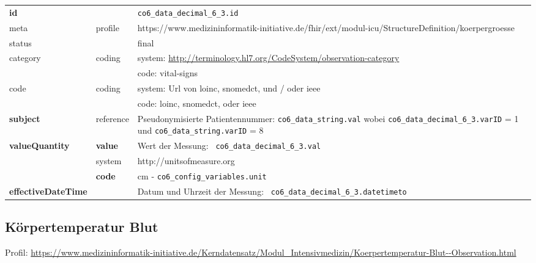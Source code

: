 \begin{longtable}{|l|l|p{7.5cm}|}
        \hline
        \rowcolor{lightgray} \multicolumn{3}{|l|}{Data Mapping (inhaltlich)} \\ \hline
        \textbf{id} &  & \texttt{co6\_data\_decimal\_6\_3.id} \\ \hline
	meta & profile & https://www.medizininformatik-initiative.de/fhir/ext/modul-icu/StructureDefinition/koerpergroesse \\ \hline 
	status &  & final   \\ \hline 
	category & coding & system: \url{http://terminology.hl7.org/CodeSystem/observation-category} \\
\cline{3-3}
	& & code: vital-signs \\ \hline
	code & coding & system: Url von \ac{loinc}, \ac{snomedct}, und / oder \ac{ieee} \\ 
	\cline{3-3} 
	 &  & code: \ac{loinc}, \ac{snomedct}, oder \ac{ieee} \\ \hline
	\textbf{subject} & reference & Pseudonymisierte Patientennummer: \texttt{co6\_data\_string.val} wobei \texttt{co6\_data\_decimal\_6\_3.varID} = 1 und \texttt{co6\_data\_string.varID} = 8 \\ \hline
	 \textbf{valueQuantity}  & \textbf{value} & Wert der Messung: \texttt{
co6\_data\_decimal\_6\_3.val} \\
        \cline{2-3}
         & system & http://unitsofmeasure.org \\
         \cline{2-3}
         & \textbf{code} & cm - \texttt{co6\_config\_variables.unit} \\ \hline
     \textbf{effectiveDateTime}  & & Datum und Uhrzeit der Messung: \texttt{
co6\_data\_decimal\_6\_3.datetimeto} \\ \hline
\end{longtable}


\subsection{Körpertemperatur Blut} 
Profil: \url{https://www.medizininformatik-initiative.de/Kerndatensatz/Modul_Intensivmedizin/Koerpertemperatur-Blut--Observation.html}

